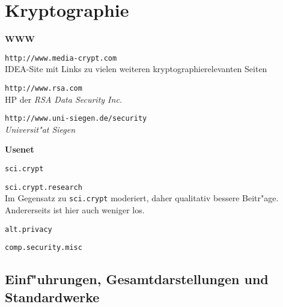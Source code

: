 \section{Kryptographie}

\textbf{WWW}

\begin{description}
  

\item \texttt{http://www.media-crypt.com} \\
  IDEA-Site mit Links zu vielen weiteren kryptographierelevanten
  Seiten
  

\item \texttt{http://www.rsa.com} \\
  HP der \textit{RSA Data Security Inc.}
  

\item \texttt{http://www.uni-siegen.de/security} \\
  \textit{Universit"at Siegen}

\end{description}

\noindent \textbf{Usenet}

\begin{description}
  
\item \texttt{sci.crypt}
  

\item \texttt{sci.crypt.research} \\
  Im Gegensatz zu \texttt{sci.crypt} moderiert, daher qualitativ
  bessere Beitr"age. Andererseits ist hier auch weniger los.
  
\item \texttt{alt.privacy}
  
\item \texttt{comp.security.misc}

\end{description}


\subsection{Einf"uhrungen, Gesamtdarstellungen und Standardwerke}

